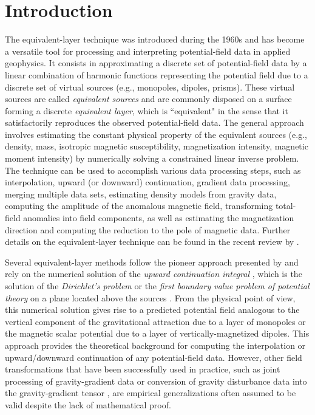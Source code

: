 \documentclass[manuscript,noblind]{geophysics}
\begin{document}
	\section{Introduction}
	
	The equivalent-layer technique was introduced during the 1960s and has become a versatile
	tool for processing and interpreting potential-field data in applied geophysics. 
	It consists in approximating a discrete set of potential-field data 
	by a linear combination of harmonic functions representing the potential field 
	due to a discrete set of virtual sources (e.g., monopoles, dipoles, prisms).
	These virtual sources are called \textit{equivalent sources} and are commonly disposed on a surface 
	forming a discrete \textit{equivalent layer}, which is ``equivalent" 
	in the sense that it satisfactorily reproduces the observed potential-field data.
	The general approach involves estimating the constant physical property of the equivalent sources 
	(e.g., density, mass, isotropic magnetic susceptibility, magnetization intensity, magnetic moment intensity) 
	by numerically solving a constrained linear inverse problem.
	The technique can be used to accomplish various data processing steps, such as interpolation, 
	upward (or downward) continuation, gradient data processing, merging multiple data sets, 
	estimating density models from gravity data, 
	computing the amplitude of the anomalous magnetic field, 
	transforming total-field anomalies into field components, 
	as well as estimating the magnetization direction and computing the reduction to the pole
	of magnetic data. 
	Further details on the equivalent-layer technique can be found in the recent review by 
	\citet{oliveirajr_etal2023}.
	
	Several equivalent-layer methods follow the pioneer approach presented
	by \citet{dampney1969} and rely on the numerical solution of the 
	\textit{upward continuation integral} \citep[e.g.,][]{skeels1947, peters1949, henderson-zietz1949,
		dean1958, roy1962, bhattacharyya1967, henderson1970}, which is the solution of the
	\textit{Dirichlet’s problem} or the \textit{first boundary value problem of potential
		theory} on a plane located above the sources \cite[][ p. 236]{kellogg1967}. 
	From the physical point of view, this numerical solution gives rise to a predicted potential field 
	analogous to the vertical component of the gravitational attraction due to a layer of monopoles
	or the magnetic scalar potential due to a layer of vertically-magnetized dipoles.
	This approach provides the theoretical background for computing the interpolation or upward/downward 
	continuation of any potential-field data.
	However, other field transformations that have been successfully used in practice, 
	such as joint processing of gravity-gradient data 
	\cite[e.g.,][]{barnes_lumley2011} or conversion of gravity disturbance data into the 
	gravity-gradient tensor \cite[e.g.,][]{piauilino_etal2019_seg, oliveirajr_etal2023}, are 
	empirical generalizations often assumed to be valid despite the lack of mathematical proof.
	
\end{document}
